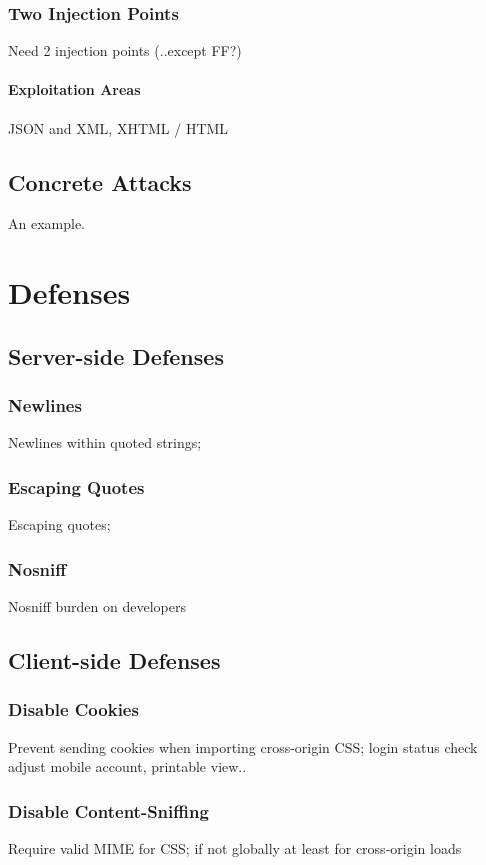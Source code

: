 \documentclass{acm_proc_article-sp}
\begin{document}
\subsubsection{Two Injection Points}
Need 2 injection points (..except FF?)

\paragraph{Exploitation Areas}
JSON and XML,  XHTML / HTML

\subsection{Concrete Attacks}
An example.

\section{Defenses}

\subsection{Server-side Defenses}
\subsubsection{Newlines}
Newlines within quoted strings;
\subsubsection{Escaping Quotes}
Escaping quotes;
\subsubsection{Nosniff}
Nosniff
burden on developers

\subsection{Client-side Defenses}
\subsubsection{Disable Cookies}
Prevent sending cookies when importing cross-origin CSS;
login status check
adjust mobile account, printable view..

\subsubsection{Disable Content-Sniffing}
Require valid MIME for CSS; if not globally at least for cross-origin loads
\end{document}
